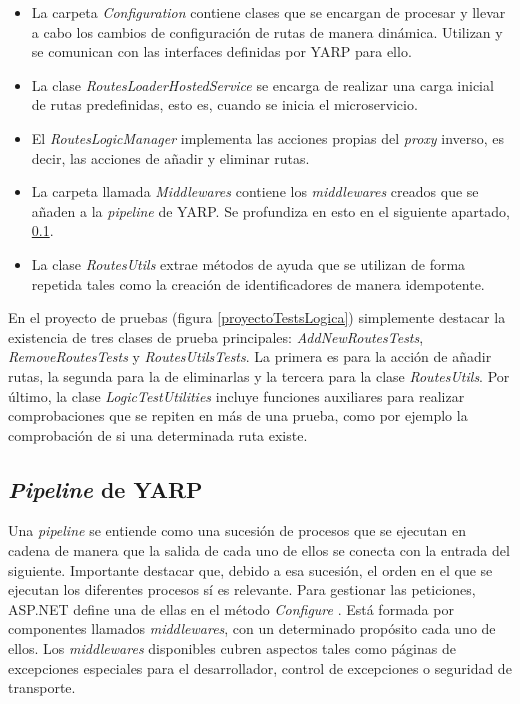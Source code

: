 \documentclass[11pt,spanish,listoffigures]{tfgetsinf}
\begin{document}
\begin{itemize}

	\item La carpeta \emph{Configuration} contiene clases que se encargan de procesar y llevar a cabo los cambios de configuración de rutas de manera dinámica. Utilizan y se comunican con las interfaces definidas por YARP para ello.

	\item La clase \emph{RoutesLoaderHostedService} se encarga de realizar una carga inicial de rutas predefinidas, esto es, cuando se inicia el microservicio.

	\item El \emph{RoutesLogicManager} implementa las acciones propias del \emph{proxy} inverso, es decir, las acciones de añadir y eliminar rutas.

	\item La carpeta llamada \emph{Middlewares} contiene los \emph{middlewares} creados que se añaden a la \emph{pipeline} de YARP. Se profundiza en esto en el siguiente apartado, \ref{pipelineYARP}.

	\item La clase \emph{RoutesUtils} extrae métodos de ayuda que se utilizan de forma repetida tales como la creación de identificadores de manera idempotente.

\end{itemize}

En el proyecto de pruebas (figura \ref{proyectoTestsLogica}) simplemente destacar la existencia de tres clases de prueba principales: \emph{AddNewRoutesTests}, \emph{RemoveRoutesTests} y \emph{RoutesUtilsTests}. La primera es para la acción de añadir rutas, la segunda para la de eliminarlas y la tercera para la clase \emph{RoutesUtils}. Por último, la clase \emph{LogicTestUtilities} incluye funciones auxiliares para realizar comprobaciones que se repiten en más de una prueba, como por ejemplo la comprobación de si una determinada ruta existe.


		\subsection{\emph{Pipeline} de YARP} \label{pipelineYARP}

Una \emph{pipeline} se entiende como una sucesión de procesos que se ejecutan en cadena de manera que la salida de cada uno de ellos se conecta con la entrada del siguiente. Importante destacar que, debido a esa sucesión, el orden en el que se ejecutan los diferentes procesos sí es relevante. Para gestionar las peticiones, ASP.NET define una de ellas en el método \emph{Configure} \cite{MiddlewaresPipeline}. Está formada por componentes llamados \emph{middlewares}, con un determinado propósito cada uno de ellos. Los \emph{middlewares} disponibles cubren aspectos tales como páginas de excepciones especiales para el desarrollador, control de excepciones o seguridad de transporte.
\end{document}
